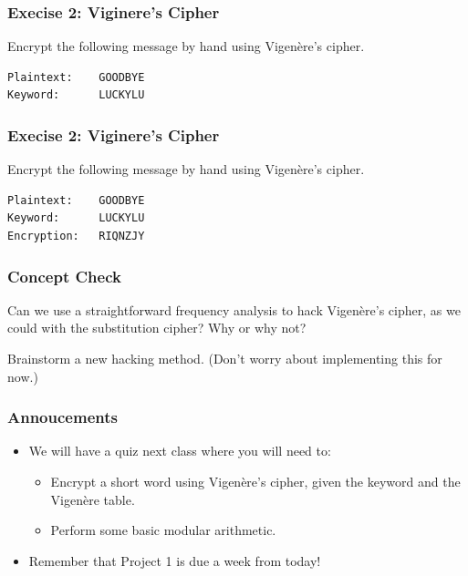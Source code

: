 \documentclass{beamer}
\newcommand{\<}{\langle}
\renewcommand{\>}{\rangle}
\begin{document}
\begin{frame}[fragile]
\frametitle{Execise 2: Viginere's Cipher}
Encrypt the following message by hand using Vigen\`{e}re's cipher. 

\begin{verbatim}
Plaintext:    GOODBYE
Keyword:      LUCKYLU
\end{verbatim}
\end{frame}


\begin{frame}[fragile]
\frametitle{Execise 2: Viginere's Cipher}
Encrypt the following message by hand using Vigen\`{e}re's cipher. 

\begin{verbatim}
Plaintext:    GOODBYE
Keyword:      LUCKYLU
Encryption:   RIQNZJY
\end{verbatim}
\end{frame}

\begin{frame}
\frametitle{Concept Check}

Can we use a straightforward frequency analysis to hack Vigen\`{e}re's cipher, as we could with the substitution cipher? Why or why not? \newline

Brainstorm a new hacking method. (Don't worry about implementing this for now.)
\end{frame}


\begin{frame}
\frametitle{Annoucements}

\begin{itemize}
\item We will have a quiz next class where you will need to:
	\begin{itemize}
	\item Encrypt a short word using Vigen\`{e}re's cipher, given the keyword and the Vigen\`{e}re table.
	\item Perform some basic modular arithmetic. 
	\end{itemize}
\item Remember that Project 1 is due a week from today!
\end{itemize}
\end{frame}
\end{document}
